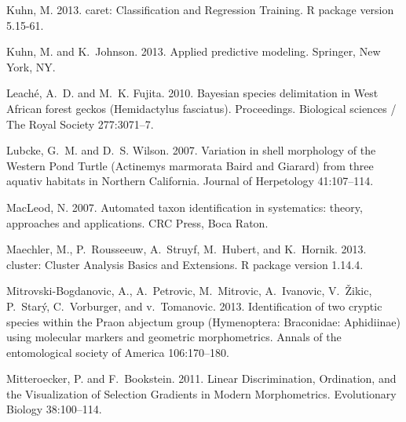 \documentclass[12pt,letterpaper]{article}
\begin{document}
\begin{thebibliography}{77}
    Kuhn, M. 2013. caret: Classification and Regression Training. R package version
    5.15-61.

    Kuhn, M. and K.~Johnson. 2013. {Applied predictive modeling}. Springer, New
    York, NY.

    Leach\'{e}, A.~D. and M.~K. Fujita. 2010. {Bayesian species delimitation in
    West African forest geckos (Hemidactylus fasciatus).} Proceedings. Biological
    sciences / The Royal Society 277:3071--7.

    Lubcke, G.~M. and D.~S. Wilson. 2007. {Variation in shell morphology of the
      Western Pond Turtle (Actinemys marmorata Baird and Giarard) from three
    aquativ habitats in Northern California}. Journal of Herpetology 41:107--114.

    MacLeod, N. 2007. {Automated taxon identification in systematics: theory,
    approaches and applications}. CRC Press, Boca Raton.

    Maechler, M., P.~Rousseeuw, A.~Struyf, M.~Hubert, and K.~Hornik. 2013. cluster:
    Cluster Analysis Basics and Extensions. R package version 1.14.4.

    Mitrovski-Bogdanovic, A., A.~Petrovic, M.~Mitrovic, A.~Ivanovic, V.~\v{Z}ikic,
    P.~Star\'{y}, C.~Vorburger, and v.~Tomanovic. 2013. {Identification of two
      cryptic species within the Praon abjectum group (Hymenoptera: Braconidae:
    Aphidiinae) using molecular markers and geometric morphometrics}. Annals of
    the entomological society of America 106:170--180.

    Mitteroecker, P. and F.~Bookstein. 2011. {Linear Discrimination, Ordination,
    and the Visualization of Selection Gradients in Modern Morphometrics}.
    Evolutionary Biology 38:100--114.


\end{thebibliography}
\end{document}
